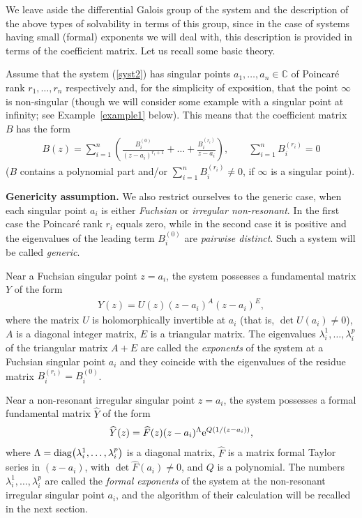 We leave aside the differential Galois group of the system and the description of the above types of solvability in terms of
this group, since in the case of systems having small (formal) exponents we will deal with, this description is provided in
terms of the coefficient matrix. Let us recall some basic theory.

Assume that the system (\ref{syst2}) has singular points $a_1,\ldots,a_n\in\mathbb C$ of Poincar\'e rank $r_1,\ldots,r_n$
respectively and, for the simplicity of exposition, that the point $\infty$ is non-singular (though we will consider some example with a singular point at infinity; see Example~\ref{example1} below). This means that the coefficient matrix $B$ has the form
\begin{gather}\label{matrix2}
B(z)=\sum_{i=1}^n\left(\frac{B^{(0)}_i}{(z-a_i)^{r_i+1}}+\dots+\frac{B^{(r_i)}_i}{z-a_i}\right), \qquad
\sum_{i=1}^nB^{(r_i)}_i=0
\end{gather}
($B$ contains a polynomial part and/or $\sum\limits_{i=1}^nB^{(r_i)}_i\ne0$, if $\infty$ is a singular point).
\medskip

{\bf Genericity assumption.} We also restrict ourselves to the generic case, when each singular point $a_i$ is either
{\it Fuchsian} or {\it irregular non-resonant}. In the first case the Poincar\'e rank $r_i$ equals zero, while in the second
case it is positive and the eigenvalues of the leading term $B^{(0)}_i$ are {\it pairwise distinct}. Such a system will be
called {\it generic}.
\medskip

Near a Fuchsian singular point $z=a_i$, the system possesses a fundamental matrix $Y$ of the form
\begin{gather*}
Y(z)=U(z)(z-a_i)^A(z-a_i)^E,
\end{gather*}
where the matrix $U$ is holomorphically invertible at $a_i$ (that is, $\det U(a_i)\ne0$), $A$ is a diagonal integer matrix,
$E$ is a triangular matrix. The eigenvalues $\lambda_i^1,\ldots,\lambda_i^p$ of the triangular matrix $A+E$ are called the
{\it exponents} of the system at a Fuchsian singular point $a_i$ and they coincide with the eigenvalues of the residue matrix
$B^{(r_i)}_i=B^{(0)}_i$.

Near a non-resonant irregular singular point $z=a_i$, the system possesses a formal fundamental matrix $\widehat Y$ of the form
\begin{gather}\label{ffm}
\widehat Y(z)=\widehat F(z)(z-a_i)^{\Lambda} {\rm e}^{Q(1/(z-a_i))},
\end{gather}
where $\Lambda={\rm diag}\big(\lambda_i^1,\ldots,\lambda_i^p\big)$ is a diagonal matrix, $\widehat F$ is a matrix formal Taylor series
in $(z-a_i)$, with $\det\widehat F(a_i)\ne0$, and $Q$ is a polynomial. The numbers $\lambda_i^1,\ldots,\lambda_i^p$ are called
the {\it formal exponents} of the system at the non-resonant irregular singular point $a_i$, and the algorithm of their calculation will be recalled in the next section.

